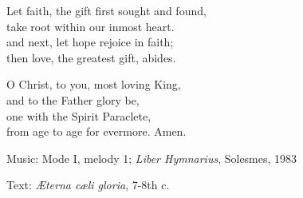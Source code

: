 \hymn



\begin{underhymnverse}
Let faith, the gift first sought and found,\\
take root within our inmost heart.\\
and next, let hope rejoice in faith;\\
then love, the greatest gift, abides.

O Christ, to you, most loving King,\\
and to the Father glory be,\\
one with the Spirit Paraclete,\\
from age to age for evermore. Amen.
\end{underhymnverse}

\begin{hymnsource}
Music: Mode I, melody 1; \emph{Liber Hymnarius}, Solesmes, 1983

Text: \emph{Æterna cæli gloria}, 7-8th c.
\end{hymnsource}
